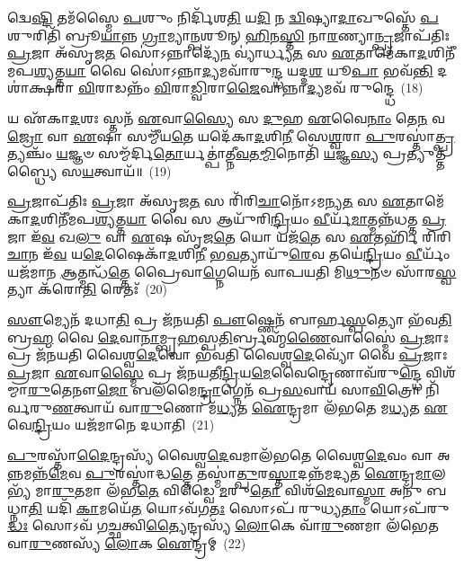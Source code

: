 𑌦𑍍𑌵𑍇\-\ul{𑌷𑍍𑌟𑌿} 𑌤𑌮᳴𑌸𑍍𑌮𑍈 \ul{𑌪}\-𑌶𑍁𑌂 𑌨𑌿𑌰𑍍𑌦𑌿᳴𑌶\-\ul{𑌤𑌿} 𑌯\-\ul{𑌦𑌿} 𑌨 \ul{𑌦𑍍𑌵𑌿}\-𑌷𑍍𑌯𑌾\-\ul{𑌦𑌾}\-𑌖𑍁𑌸𑍍𑌤𑍇᳴ \ul{𑌪}\-𑌶𑍁𑌰𑌿𑌤𑌿᳴ 𑌬𑍍𑌰𑍂\-\ul{𑌯𑌾}\-𑌨𑍍𑌨 \ul{𑌗𑍍𑌰𑌾}\-𑌮𑍍𑌯𑌾\-\ul{𑌨𑍍𑌪}\-𑌶𑍂𑌨𑍍 \ul{𑌹𑌿}\-𑌨\-\ul{𑌸𑍍𑌤𑌿} 𑌨𑌾\-\ul{𑌰}\-𑌣𑍍𑌯𑌾\-\ul{𑌨𑍍𑌪𑍍𑌰}\-𑌜𑌾𑌪᳴𑌤𑌿𑌃 \ul{𑌪𑍍𑌰}\-𑌜𑌾 𑌅᳴𑌸𑍃𑌜\-\ul{𑌤} 𑌸𑍋॑\-𑌽𑌨𑍍𑌨𑌾𑌦𑍍𑌯𑍇᳴\-\ul{𑌨} 𑌵𑍍𑌯𑌾॑𑌰𑍍𑌧𑍍𑌯\-\ul{𑌤} 𑌸 \ul{𑌏}\-𑌤𑌾𑌮𑍇᳴𑌕𑌾\-\ul{𑌦}\-𑌶𑌿𑌨𑍀᳴𑌮𑌪\-\ul{𑌶𑍍𑌯}\-𑌤𑍍𑌤\-\ul{𑌯𑌾} 𑌵𑍈 𑌸𑍋॑\-𑌽𑌨𑍍𑌨𑌾\-\ul{𑌦𑍍𑌯}\-𑌮𑌵𑌾᳴𑌰𑍁\-\ul{𑌨𑍍𑌦𑍍𑌧} 𑌯𑌦𑍍𑌦\-\ul{𑌶} 𑌯𑍂\-\ul{𑌪𑌾} 𑌭𑌵᳴\-\ul{𑌨𑍍𑌤𑌿} 𑌦𑌶𑌾॑𑌕𑍍𑌷𑌰𑌾 \ul{𑌵𑌿}\-𑌰𑌾𑌡𑌨𑍍𑌨𑌂᳴ \ul{𑌵𑌿}\-𑌰𑌾\-\ul{𑌡𑍍𑌵𑌿}\-𑌰𑌾\-\ul{𑌜𑍈}\-𑌵𑌾𑌨𑍍𑌨𑌾\-\ul{𑌦𑍍𑌯}\-𑌮𑌵᳴ 𑌰𑍁𑌨𑍍𑌦𑍍𑌧𑍇~(18)

𑌯 𑌏᳴𑌕𑌾\-\ul{𑌦}\-𑌶𑌃 𑌸𑍍𑌤𑌨᳴ \ul{𑌏}\-𑌵𑌾\-\ul{𑌸𑍍𑌯𑍈} 𑌸 \ul{𑌦𑍁}\-𑌹 \ul{𑌏}\-𑌵𑍈\-\ul{𑌨𑌾𑌂} 𑌤𑍇\-\ul{𑌨} 𑌵\-\ul{𑌜𑍍𑌰𑍋} 𑌵𑌾 \ul{𑌏}\-𑌷𑌾 𑌸𑌮𑍍𑌮𑍀᳴𑌯\-\ul{𑌤𑍇} 𑌯𑌦𑍇᳴𑌕𑌾\-\ul{𑌦}\-𑌶𑌿\-\ul{𑌨𑍀} 𑌸𑍇\-\ul{𑌶𑍍𑌵}\-𑌰𑌾 \ul{𑌪𑍁}\-𑌰𑌸𑍍𑌤𑌾॑\-\ul{𑌤𑍍𑌪𑍍𑌰}\-𑌤𑍍𑌯𑌞𑍍𑌚𑌂᳴ \ul{𑌯}\-𑌜𑍍𑌞𑍞 𑌸𑌮𑍍𑌮᳴𑌰𑍍𑌦𑌿\-\ul{𑌤𑍋}\-𑌰𑍍𑌯𑌤𑍍𑌪𑌾॑𑌤𑍍𑌨𑍀\-\ul{𑌵}\-𑌤\-\ul{𑌮𑍍𑌮𑌿}\-𑌨𑍋𑌤𑌿᳴ \ul{𑌯}\-𑌜𑍍𑌞\-\ul{𑌸𑍍𑌯} 𑌪𑍍𑌰𑌤𑍍𑌯𑍁𑌤𑍍𑌤᳴𑌬𑍍𑌧𑍍𑌯𑍈 𑌸\-\ul{𑌯}\-𑌤𑍍𑌵𑌾𑌯᳴॥~(19)

{\anuvakamend[{𑌵𑍈 𑌸𑌮᳴\-\ul{𑌷𑍍𑌟𑍍𑌯𑍈} 𑌪𑍁𑌮𑌾᳴\-\ul{𑌨𑍇}\-𑌵𑌾\-\ul{𑌸𑍍𑌯} 𑌯\-\ul{𑌮𑍇}\-𑌵 𑌰𑍁᳴𑌨𑍍𑌧𑍇 \ul{𑌤𑍍𑌰𑌿}\-\-\ul{𑍞}\-𑌶𑌚𑍍𑌚᳴}]}%

\-\ul{𑌪𑍍𑌰}\-𑌜𑌾𑌪᳴𑌤𑌿𑌃 \ul{𑌪𑍍𑌰}\-𑌜𑌾 𑌅᳴𑌸𑍃𑌜\-\ul{𑌤} 𑌸 𑌰𑌿᳴𑌰𑌿\-\ul{𑌚𑌾}\-𑌨𑍋᳴\-𑌽𑌮𑌨𑍍𑌯\-\ul{𑌤} 𑌸 \ul{𑌏}\-𑌤𑌾𑌮𑍇᳴𑌕𑌾\-\ul{𑌦}\-𑌶𑌿𑌨𑍀᳴𑌮𑌪\-\ul{𑌶𑍍𑌯}\-𑌤𑍍𑌤\-\ul{𑌯𑌾} 𑌵𑍈 𑌸 𑌆𑌯𑍁᳴𑌰𑌿\-\ul{𑌨𑍍𑌦𑍍𑌰𑌿}\-𑌯𑌂 \ul{𑌵𑍀}\-𑌰𑍍𑌯᳴\-\ul{𑌮𑌾}\-𑌤𑍍𑌮𑌨𑍍𑌨᳴𑌧𑌤𑍍𑌤 \ul{𑌪𑍍𑌰}\-𑌜𑌾 𑌇᳴\-\ul{𑌵} 𑌖\-\ul{𑌲𑍁} 𑌵𑌾 \ul{𑌏}\-𑌷 𑌸𑍃᳴𑌜\-\ul{𑌤𑍇} 𑌯𑍋 𑌯𑌜᳴\-\ul{𑌤𑍇} 𑌸 \ul{𑌏}\-𑌤𑌰𑍍\mbox{}𑌹𑌿᳴ 𑌰𑌿𑌰𑌿\-\ul{𑌚𑌾}\-𑌨 𑌇᳴\-\ul{𑌵} 𑌯\-\ul{𑌦𑍇}\-𑌷𑍈𑌕𑌾᳴\-\ul{𑌦}\-𑌶𑌿\-\ul{𑌨𑍀} 𑌭\-\ul{𑌵}\-𑌤𑍍𑌯𑌾𑌯𑍁᳴\-\ul{𑌰𑍇}\-𑌵 𑌤𑌯𑍇॑\-\ul{𑌨𑍍𑌦𑍍𑌰𑌿}\-𑌯𑌂 \ul{𑌵𑍀}\-𑌰𑍍𑌯𑌂᳴ 𑌯𑌜᳴𑌮𑌾𑌨 \ul{𑌆}\-𑌤𑍍𑌮𑌨𑍍𑌧᳴\-\ul{𑌤𑍍𑌤𑍇} 𑌪𑍍𑌰𑍈𑌵𑌾\-\ul{𑌗𑍍𑌨𑍇}\-𑌯𑍇𑌨᳴ 𑌵𑌾𑌪𑌯𑌤𑌿 𑌮𑌿\-\ul{𑌥𑍁}\-𑌨𑍞 𑌸𑌾᳴𑌰\-\ul{𑌸𑍍𑌵}\-𑌤𑍍𑌯𑌾 𑌕᳴𑌰𑍋\-\ul{𑌤𑌿} 𑌰𑍇𑌤𑌃᳴~(20)

\-\ul{𑌸𑍗}\-𑌮𑍍𑌯𑍇𑌨᳴ 𑌦𑌧𑌾\-\ul{𑌤𑌿} 𑌪𑍍𑌰 𑌜᳴𑌨𑌯𑌤𑌿 \ul{𑌪𑍗}\-𑌷𑍍𑌣𑍇𑌨᳴ 𑌬𑌾𑌰𑍍\mbox{}𑌹\-\ul{𑌸𑍍𑌪}\-𑌤𑍍𑌯𑍋 𑌭᳴𑌵\-\ul{𑌤𑌿} 𑌬𑍍𑌰\-\ul{𑌹𑍍𑌮} 𑌵𑍈 \ul{𑌦𑍇}\-𑌵𑌾\-\ul{𑌨𑌾}\-𑌮𑍍𑌬𑍃\-\ul{𑌹}\-𑌸𑍍𑌪\-\ul{𑌤𑌿}\-𑌰𑍍𑌬𑍍𑌰𑌹𑍍𑌮᳴\-\ul{𑌣𑍈}\-𑌵𑌾𑌸𑍍𑌮𑍈॑ \ul{𑌪𑍍𑌰}\-𑌜𑌾𑌃 𑌪𑍍𑌰 𑌜᳴𑌨𑌯𑌤𑌿 𑌵𑍈𑌶𑍍𑌵\-\ul{𑌦𑍇}\-𑌵𑍋 𑌭᳴𑌵𑌤𑌿 𑌵𑍈𑌶𑍍𑌵\-\ul{𑌦𑍇}\-𑌵𑍍𑌯𑍋᳴ 𑌵𑍈 \ul{𑌪𑍍𑌰}\-𑌜𑌾𑌃 \ul{𑌪𑍍𑌰}\-𑌜𑌾 \ul{𑌏}\-𑌵𑌾\-\ul{𑌸𑍍𑌮𑍈} 𑌪𑍍𑌰 𑌜᳴𑌨𑌯𑌤𑍀\-\ul{𑌨𑍍𑌦𑍍𑌰𑌿}\-𑌯\-\ul{𑌮𑍇}\-𑌵𑍈𑌨𑍍𑌦𑍍𑌰𑍇𑌣𑌾𑌵᳴𑌰𑍁\-\ul{𑌨𑍍𑌦𑍍𑌧𑍇} 𑌵𑌿𑌶᳴𑌮𑍍𑌮𑌾\-\ul{𑌰𑍁}\-𑌤𑍇𑌨𑍗\-\ul{𑌜𑍋} 𑌬𑌲᳴𑌮𑍈\-\ul{𑌨𑍍𑌦𑍍𑌰𑌾}\-𑌗𑍍𑌨𑍇𑌨᳴ 𑌪𑍍𑌰\-\ul{𑌸}\-𑌵𑌾𑌯᳴ 𑌸𑌾\-\ul{𑌵𑌿}\-𑌤𑍍𑌰𑍋 𑌨𑌿᳴𑌰𑍍𑌵𑌰𑍁\-\ul{𑌣}\-𑌤𑍍𑌵𑌾𑌯᳴ 𑌵𑌾\-\ul{𑌰𑍁}\-𑌣𑍋 𑌮᳴\-\ul{𑌧𑍍𑌯}\-𑌤 \ul{𑌐}\-𑌨𑍍𑌦𑍍𑌰𑌮𑌾 𑌲᳴𑌭𑌤𑍇 𑌮\-\ul{𑌧𑍍𑌯}\-𑌤 \ul{𑌏}\-𑌵𑍇\-\ul{𑌨𑍍𑌦𑍍𑌰𑌿}\-𑌯𑌂 𑌯𑌜᳴𑌮𑌾𑌨𑍇 𑌦𑌧𑌾𑌤𑌿~(21)

\-\ul{𑌪𑍁}\-𑌰𑌸𑍍𑌤𑌾᳴\-\ul{𑌦𑍈}\-𑌨𑍍𑌦𑍍𑌰𑌸𑍍𑌯᳴ 𑌵𑍈𑌶𑍍𑌵\-\ul{𑌦𑍇}\-𑌵𑌮𑌾𑌲᳴𑌭𑌤𑍇 𑌵𑍈𑌶𑍍𑌵\-\ul{𑌦𑍇}\-𑌵𑌂 𑌵𑌾 𑌅\-\ul{𑌨𑍍𑌨}\-𑌮𑌨𑍍𑌨᳴\-\ul{𑌮𑍇}\-𑌵 \ul{𑌪𑍁}\-𑌰𑌸𑍍𑌤𑌾॑𑌦𑍍𑌧\-\ul{𑌤𑍍𑌤𑍇} 𑌤𑌸𑍍𑌮𑌾॑\-\ul{𑌤𑍍𑌪𑍁}\-𑌰\-\ul{𑌸𑍍𑌤𑌾}\-𑌦𑌨𑍍𑌨᳴𑌮𑌦𑍍𑌯𑌤 \ul{𑌐}\-𑌨𑍍𑌦𑍍𑌰\-\ul{𑌮𑌾}\-𑌲𑌭𑍍𑌯᳴ 𑌮𑌾\-\ul{𑌰𑍁}\-𑌤𑌮𑌾 𑌲᳴𑌭\-\ul{𑌤𑍇} 𑌵𑌿𑌡𑍍𑌵𑍈 \ul{𑌮}\-𑌰𑍁\-\ul{𑌤𑍋} 𑌵𑌿𑌶᳴\-\ul{𑌮𑍇}\-𑌵𑌾\-\ul{𑌸𑍍𑌮𑌾} 𑌅𑌨𑍁᳴ 𑌬𑌧𑍍𑌨𑌾\-\ul{𑌤𑌿} 𑌯𑌦𑌿᳴ \ul{𑌕𑌾}\-𑌮𑌯𑍇᳴\-\ul{𑌤} 𑌯𑍋\-𑌽𑌵᳴𑌗\-\ul{𑌤𑌃} 𑌸𑍋\-𑌽𑌪᳴ 𑌰𑍁𑌧𑍍𑌯\-\ul{𑌤𑌾𑌂} 𑌯𑍋\-𑌽𑌪᳴𑌰𑍁\-\ul{𑌦𑍍𑌧𑌃} 𑌸𑍋\-𑌽𑌵᳴ 𑌗\-\ul{𑌚𑍍𑌛}\-𑌤𑍍𑌵𑌿\-\ul{𑌤𑍍𑌯𑍈}\-𑌨𑍍𑌦𑍍𑌰𑌸𑍍𑌯᳴ \ul{𑌲𑍋}\-𑌕𑍇 𑌵𑌾᳴\-\ul{𑌰𑍁}\-𑌣𑌮𑌾 𑌲᳴𑌭𑍇𑌤 𑌵𑌾\-\ul{𑌰𑍁}\-𑌣𑌸𑍍𑌯᳴ \ul{𑌲𑍋}\-𑌕 \ul{𑌐}\-𑌨𑍍𑌦𑍍𑌰𑌮𑍍~(22)


